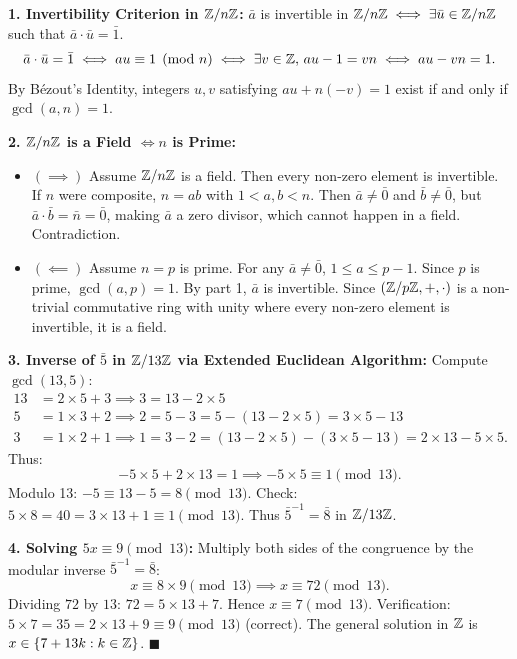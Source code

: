 \begin{solution}
\textbf{1. Invertibility Criterion in $\mathbb{Z}/n\mathbb{Z}$:}
$\bar{a}$ is invertible in $\mathbb{Z}/n\mathbb{Z} \iff \exists \bar{u} \in \mathbb{Z}/n\mathbb{Z}$ such that $\bar{a} \cdot \bar{u} = \bar{1}$.
\[
\bar{a} \cdot \bar{u} = \bar{1} \iff au \equiv 1 \pmod n \iff \exists v \in \mathbb{Z},\, au - 1 = vn \iff au - vn = 1.
\]
By Bézout's Identity, integers $u, v$ satisfying $au + n(-v) = 1$ exist if and only if $\gcd(a, n) = 1$.

\textbf{2. $\mathbb{Z}/n\mathbb{Z}$ is a Field $\iff n$ is Prime:}
\begin{itemize}[leftmargin=1.5em,itemsep=2pt]
  \item $(\implies)$ Assume $\mathbb{Z}/n\mathbb{Z}$ is a field. Then every non-zero element is invertible.
  If $n$ were composite, $n = ab$ with $1 < a, b < n$.
  Then $\bar{a} \ne \bar{0}$ and $\bar{b} \ne \bar{0}$, but $\bar{a} \cdot \bar{b} = \bar{n} = \bar{0}$, making $\bar{a}$ a zero divisor, which cannot happen in a field. Contradiction.
  \item $(\impliedby)$ Assume $n = p$ is prime. For any $\bar{a} \ne \bar{0}$, $1 \le a \le p - 1$.
  Since $p$ is prime, $\gcd(a, p) = 1$. By part 1, $\bar{a}$ is invertible.
  Since $(\mathbb{Z}/p\mathbb{Z}, +, \cdot)$ is a non-trivial commutative ring with unity where every non-zero element is invertible, it is a field.
\end{itemize}

\textbf{3. Inverse of $\bar{5}$ in $\mathbb{Z}/13\mathbb{Z}$ via Extended Euclidean Algorithm:}
Compute $\gcd(13, 5)$:
\begin{align*}
13 &= 2 \times 5 + 3 \implies 3 = 13 - 2 \times 5 \\
5 &= 1 \times 3 + 2 \implies 2 = 5 - 3 = 5 - (13 - 2 \times 5) = 3 \times 5 - 13 \\
3 &= 1 \times 2 + 1 \implies 1 = 3 - 2 = (13 - 2 \times 5) - (3 \times 5 - 13) = 2 \times 13 - 5 \times 5.
\end{align*}
Thus:
\[
-5 \times 5 + 2 \times 13 = 1 \implies -5 \times 5 \equiv 1 \pmod{13}.
\]
Modulo 13: $-5 \equiv 13 - 5 = 8 \pmod{13}$.
Check: $5 \times 8 = 40 = 3 \times 13 + 1 \equiv 1 \pmod{13}$.
Thus $\bar{5}^{-1} = \bar{8}$ in $\mathbb{Z}/13\mathbb{Z}$.

\textbf{4. Solving $5x \equiv 9 \pmod{13}$:}
Multiply both sides of the congruence by the modular inverse $\bar{5}^{-1} = \bar{8}$:
\[
x \equiv 8 \times 9 \pmod{13} \implies x \equiv 72 \pmod{13}.
\]
Dividing $72$ by $13$: $72 = 5 \times 13 + 7$.
Hence $x \equiv 7 \pmod{13}$.
Verification: $5 \times 7 = 35 = 2 \times 13 + 9 \equiv 9 \pmod{13}$ (correct).
The general solution in $\mathbb{Z}$ is $x \in \{7 + 13k : k \in \mathbb{Z}\}$. \hfill $\blacksquare$
\end{solution}

